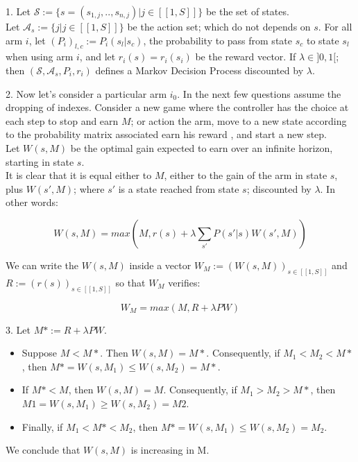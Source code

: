 \documentclass[12pt]{article}
\begin{document}
1. Let $\mathcal{S} := \{s = (s_{1,j}, .. , s_{n, j}) | j \in [[1, S]]  \}$ be the set of states.\\
 Let $\mathcal{A}_s := \{j | j \in [[1, S]]\}$ be the action set; which do not depends on $s$. 
 For all arm $i$, let $(P_i)_{l,c} := P_i(s_l |s_c)$, the probability to pass from state $s_c$ to state $s_l$ when using arm $i$, and let $r_i(s) = r_i(s_i)$ be the reward vector. 
If $\lambda \in ]0,1[$; then  $(\mathcal{S}, \mathcal{A}_s, P_i, r_i)$ defines a Markov Decision Process discounted by $\lambda$. 

2. Now let's consider a particular arm $i_0$. In the next few questions assume the dropping of indexes. 
Consider a new game where the controller has the choice at each step to stop and earn $M$\footnotemark ; or action the arm, move to a new state according to the probability matrix associated earn his reward \footnotemark[\value{footnote}], and start a new step. \\
Let $W(s,M)$ be the optimal gain expected to earn over an infinite horizon, starting in state $s$. \\
It is clear that it is equal either to $M$, either to the gain of the arm in state $s$, plus $W(s', M)$; where $s'$ is a state reached from state $s$; discounted by $\lambda$. In other words: 

$$W(s,M) = max( M , r(s) + \lambda  \sum_{s'} P(s' | s) W(s', M)) $$

We can write the $W(s,M)$ inside a vector $W_M := (W(s,M))_{s\in [[1, S]]}$ and $R := (r(s))_{s \in [[1,S]]}$ so that $W_M$ verifies:

$$ W_M = max ( M , R + \lambda PW)$$

3. Let $M* := R + \lambda PW$.

\begin{itemize}
    \item Suppose $M< M*$. Then $ W(s,M) = M*$. Consequently, if $M_1 < M_2 < M*$, then  $M* = W(s, M_1) \le W(s, M_2) = M*$.
    \item If $M* < M$, then $W(s, M) = M$. Consequently, if $M_1 > M_2 > M*$, then $M1 = W(s, M_1) \ge W(s, M_2) = M2$.
    \item Finally, if $M_1 < M* < M_2$, then $M* = W(s, M_1)  \le W(s, M_2) = M_2$.
\end{itemize}

We conclude that $W(s, M)$ is increasing in M. \\
\end{document}
